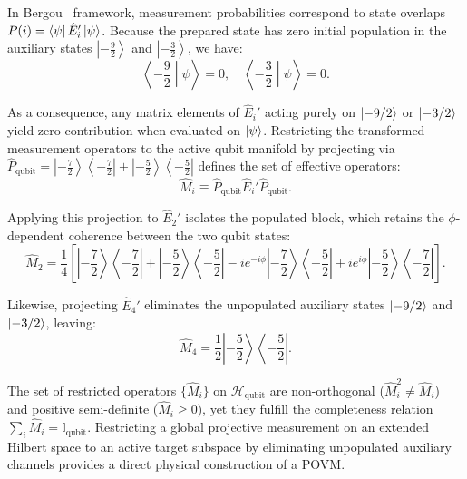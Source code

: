 In Bergou~\cite{Bergou2007} framework, measurement probabilities correspond to state overlaps $P(i) = \bra{\psi} \hat{E}_i' \ket{\psi}$. Because the prepared state has zero initial population in the auxiliary states $\left|-\frac{9}{2}\right\rangle$ and $\left|-\frac{3}{2}\right\rangle$, we have:
\begin{equation}
    \left\langle -\frac{9}{2} \middle| \psi \right\rangle = 0, \quad \left\langle -\frac{3}{2} \middle| \psi \right\rangle = 0.
\end{equation}

As a consequence, any matrix elements of $\hat{E}_i'$ acting purely on $\ket{-9/2}$ or $\ket{-3/2}$ yield zero contribution when evaluated on $\ket{\psi}$. Restricting the transformed measurement operators to the active qubit manifold by projecting via $\hat{P}_{\text{qubit}} = \left|-\frac{7}{2}\right\rangle\left\langle -\frac{7}{2}\right| + \left|-\frac{5}{2}\right\rangle\left\langle -\frac{5}{2}\right|$ defines the set of effective operators:
\begin{equation}
    \hat{M}_i \equiv \hat{P}_{\text{qubit}} \hat{E}_i' \hat{P}_{\text{qubit}}.
\end{equation}

Applying this projection to $\hat{E}_2'$ isolates the populated block, which retains the $\phi$-dependent coherence between the two qubit states:
\begin{equation}
    \hat{M}_2 = \frac{1}{4} \left[ \left|-\frac{7}{2}\right\rangle\left\langle -\frac{7}{2}\right| + \left|-\frac{5}{2}\right\rangle\left\langle -\frac{5}{2}\right| - i e^{-i\phi} \left|-\frac{7}{2}\right\rangle\left\langle -\frac{5}{2}\right| + i e^{i\phi} \left|-\frac{5}{2}\right\rangle\left\langle -\frac{7}{2}\right| \right]. \label{eq:M2}
\end{equation}

Likewise, projecting $\hat{E}_4'$ eliminates the unpopulated auxiliary states $\ket{-9/2}$ and $\ket{-3/2}$, leaving:
\begin{equation}
    \hat{M}_4 = \frac{1}{2} \left|-\frac{5}{2}\right\rangle\left\langle -\frac{5}{2}\right|. \label{eq:M4}
\end{equation}

The set of restricted operators $\{\hat{M}_i\}$ on $\mathcal{H}_{\text{qubit}}$ are non-orthogonal ($\hat{M}_i^2 \neq \hat{M}_i$) and positive semi-definite ($\hat{M}_i \ge 0$), yet they fulfill the completeness relation $\sum_i \hat{M}_i = \mathbb{I}_{\text{qubit}}$. Restricting a global projective measurement on an extended Hilbert space to an active target subspace by eliminating unpopulated auxiliary channels provides a direct physical construction of a POVM.

